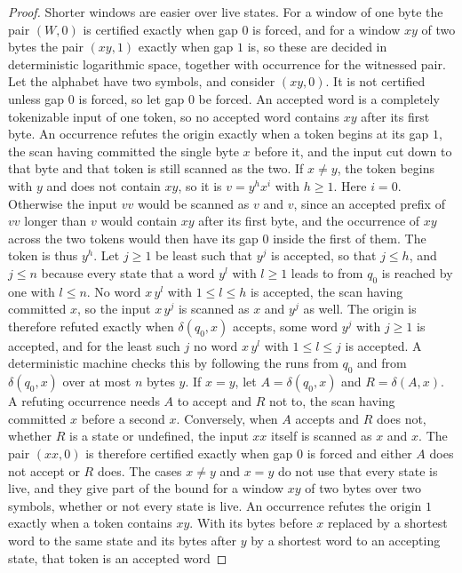\documentclass[11pt,a4paper]{article}
\theoremstyle{definition}
\theoremstyle{plain}
\begin{document}
\begin{proof}
Shorter windows are easier over live states. For a window of one byte the pair $(W, 0)$ is certified exactly when gap
$0$ is forced, and for a window $xy$ of two bytes the pair $(xy, 1)$ exactly when gap $1$ is, so these are decided in
deterministic logarithmic space, together with occurrence for the witnessed pair. Let the alphabet have two symbols, and
consider $(xy, 0)$. It is not certified unless gap $0$ is forced, so let gap $0$ be forced. An accepted word is a
completely tokenizable input of one token, so no accepted word contains $xy$ after its first byte. An occurrence refutes
the origin exactly when a token begins at its gap $1$, the scan having committed the single byte $x$ before it, and the
input cut down to that byte and that token is still scanned as the two. If $x \neq y$, the token begins with $y$ and
does not contain $xy$, so it is $v = y^{h} x^{i}$ with $h \geq 1$. Here $i = 0$. Otherwise the input $v v$ would be
scanned as $v$ and $v$, since an accepted prefix of $v v$ longer than $v$ would contain $xy$ after its first byte, and
the occurrence of $xy$ across the two tokens would then have its gap $0$ inside the first of them. The token is thus
$y^{h}$. Let $j \geq 1$ be least such that $y^{j}$ is accepted, so that $j \leq h$, and $j \leq n$ because every state
that a word $y^{l}$ with $l \geq 1$ leads to from $q_0$ is reached by one with $l \leq n$. No word $x\, y^{l}$ with
$1 \leq l \leq h$ is accepted, the scan having committed $x$, so the input $x\, y^{j}$ is scanned as $x$ and $y^{j}$ as
well. The origin is therefore refuted exactly when $\delta(q_0, x)$ accepts, some word $y^{j}$ with $j \geq 1$ is
accepted, and for the least such $j$ no word $x\, y^{l}$ with $1 \leq l \leq j$ is accepted. A deterministic machine
checks this by following the runs from $q_0$ and from $\delta(q_0, x)$ over at most $n$ bytes $y$. If $x = y$, let
$A = \delta(q_0, x)$ and $R = \delta(A, x)$. A refuting occurrence needs $A$ to accept and $R$ not to, the scan having
committed $x$ before a second $x$. Conversely, when $A$ accepts and $R$ does not, whether $R$ is a state or undefined,
the input $xx$ itself is scanned as $x$ and $x$. The pair $(xx, 0)$ is therefore certified exactly when gap $0$ is
forced and either $A$ does not accept or $R$ does. The cases $x \neq y$ and $x = y$ do not use that every state is live,
and they give part of the bound for a window $xy$ of two bytes over two symbols, whether or not every state is live. An
occurrence refutes the origin $1$ exactly when a token contains $xy$. With its bytes before $x$ replaced by a shortest
word to the same state and its bytes after $y$ by a shortest word to an accepting state, that token is an accepted word

\end{proof}
\end{document}
